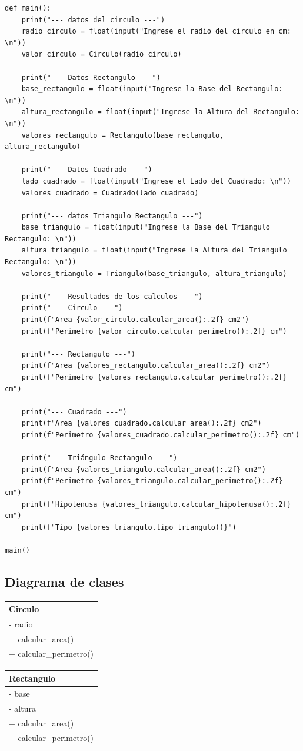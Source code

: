 \documentclass[11pt, a4paper]{article}
\newcommand{\clasebox}[3]{%
\begin{center}
\begin{tabular}{|l|}
\hline
\textbf{#1} \\
\hline
#2
\hline
#3
\hline
\end{tabular}
\end{center}
}
\begin{document}
\begin{lstlisting}
def main():
    print("--- datos del circulo ---")
    radio_circulo = float(input("Ingrese el radio del circulo en cm: \n"))
    valor_circulo = Circulo(radio_circulo)

    print("--- Datos Rectangulo ---")
    base_rectangulo = float(input("Ingrese la Base del Rectangulo: \n"))
    altura_rectangulo = float(input("Ingrese la Altura del Rectangulo: \n"))
    valores_rectangulo = Rectangulo(base_rectangulo, altura_rectangulo)

    print("--- Datos Cuadrado ---")
    lado_cuadrado = float(input("Ingrese el Lado del Cuadrado: \n"))
    valores_cuadrado = Cuadrado(lado_cuadrado)

    print("--- datos Triangulo Rectangulo ---")
    base_triangulo = float(input("Ingrese la Base del Triangulo Rectangulo: \n"))
    altura_triangulo = float(input("Ingrese la Altura del Triangulo Rectangulo: \n"))
    valores_triangulo = Triangulo(base_triangulo, altura_triangulo)

    print("--- Resultados de los calculos ---")
    print("--- Círculo ---")
    print(f"Area {valor_circulo.calcular_area():.2f} cm2")
    print(f"Perimetro {valor_circulo.calcular_perimetro():.2f} cm")

    print("--- Rectangulo ---")
    print(f"Area {valores_rectangulo.calcular_area():.2f} cm2")
    print(f"Perimetro {valores_rectangulo.calcular_perimetro():.2f} cm")

    print("--- Cuadrado ---")
    print(f"Area {valores_cuadrado.calcular_area():.2f} cm2")
    print(f"Perimetro {valores_cuadrado.calcular_perimetro():.2f} cm")

    print("--- Triángulo Rectangulo ---")
    print(f"Area {valores_triangulo.calcular_area():.2f} cm2")
    print(f"Perimetro {valores_triangulo.calcular_perimetro():.2f} cm")
    print(f"Hipotenusa {valores_triangulo.calcular_hipotenusa():.2f} cm")
    print(f"Tipo {valores_triangulo.tipo_triangulo()}")

main()
\end{lstlisting}

\subsection{Diagrama de clases}
\clasebox{Circulo}
{%
- radio \\
}
{%
+ calcular\_area() \\
+ calcular\_perimetro() \\
}

\clasebox{Rectangulo}
{%
- base \\
- altura \\
}
{%
+ calcular\_area() \\
+ calcular\_perimetro() \\
}
\end{document}
